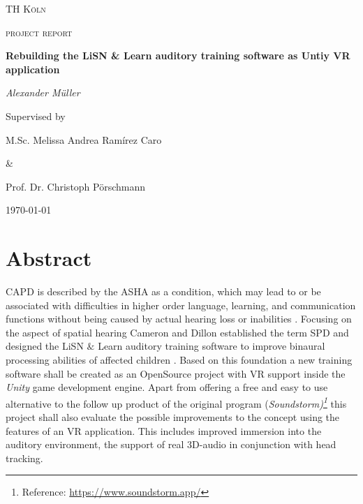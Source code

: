 \documentclass[a4paper,11pt]{article}%
\renewcommand{\\}{\vspace*{0.5\baselineskip} \newline}
\begin{document}

\begin{titlepage}
	\centering
	{\scshape\LARGE TH Köln \par}
	\vspace{1cm}
	{\scshape\Large project report\par}
	\vspace{1.5cm}
	{\huge\bfseries Rebuilding the \acs{LiSN} \& Learn auditory training software as Untiy \acs{VR} application\par}
	\vspace{2cm}
	{\Large\itshape Alexander Müller \par}
	\vfill
	Supervised by\par
	M.Sc. Melissa Andrea Ramírez Caro \par \&  \par Prof. Dr. Christoph Pörschmann
	\vfill

	{\large \today\par}
\end{titlepage}


\newpage

\tableofcontents
\newpage



\section*{Abstract}
\ac{CAPD} is described by the \ac{ASHA} as a condition, which \dq may lead to or be associated with difficulties in higher order language, learning, and communication functions\dq{} without being caused by actual hearing loss or inabilities \cite{ASHA}. Focusing on the aspect of spatial hearing Cameron and Dillon established the term \ac{SPD} and designed the \ac{LiSN} $\&$ Learn auditory training software to improve binaural processing abilities of affected children \cite{LiSN-A}.
\newline
\newline
Based on this foundation a new training software shall be created as an OpenSource project with \ac{VR} support inside the \textit{Unity} game development engine. Apart from offering a free and easy to use alternative to the follow up product of the original program (\textit{Soundstorm)\footnote{Reference: \url{https://www.soundstorm.app/}}} this project shall also evaluate the possible improvements to the concept using the features of an \ac{VR} application. This includes improved immersion into the auditory environment, the support of real 3D-audio in conjunction with head tracking.
\end{document}
